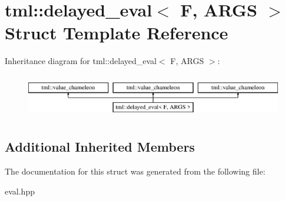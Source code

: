 \hypertarget{structtml_1_1delayed__eval}{\section{tml\+:\+:delayed\+\_\+eval$<$ F, A\+R\+G\+S $>$ Struct Template Reference}
\label{structtml_1_1delayed__eval}
}
Inheritance diagram for tml\+:\+:delayed\+\_\+eval$<$ F, A\+R\+G\+S $>$\+:\begin{figure}[H]
\begin{center}
\leavevmode
\includegraphics[height=1.944445cm]{structtml_1_1delayed__eval}
\end{center}
\end{figure}
\subsection*{Additional Inherited Members}


The documentation for this struct was generated from the following file\+:\begin{DoxyCompactItemize}
\item 
eval.\+hpp\end{DoxyCompactItemize}

